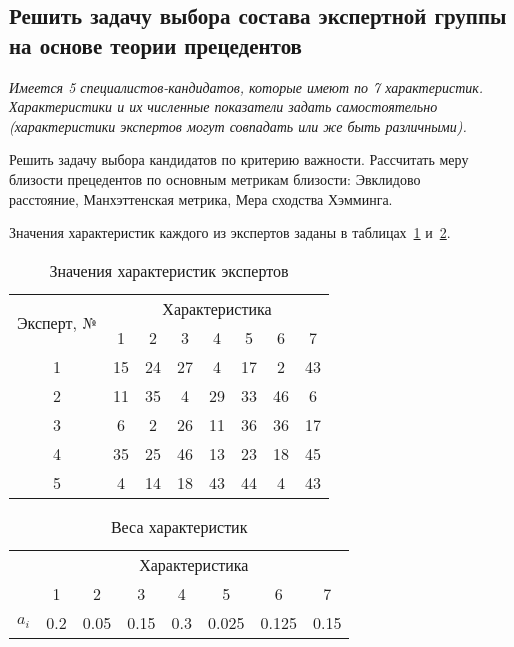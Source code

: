 \subsection{Решить задачу выбора состава экспертной группы на основе теории прецедентов}
{
	\itshape
	Имеется 5 специалистов-кандидатов, которые имеют по 7 характеристик.
	Характеристики и их численные показатели задать самостоятельно \\ (характеристики экспертов могут совпадать или же быть различными).

	Решить задачу выбора кандидатов по критерию важности. Рассчитать меру близости прецедентов по основным метрикам близости: Эвклидово \\ расстояние, Манхэттенская метрика, Мера сходства Хэмминга.
}

Значения характеристик каждого из экспертов заданы в таблицах~\ref{tab:expert_char} и~\ref{tab:expert_char_w}.

\begin{table}[H]
	\caption{Значения характеристик экспертов}
	\label{tab:expert_char}
	\begin{tabular}{|c|c|c|c|c|c|c|c|}
		\hline
		\multirow{2}{*}{Эксперт, № } & \multicolumn{7}{c|}{Характеристика}                               \\ \cline{2-8}
		                             & 1                                   & 2  & 3  & 4  & 5  & 6  & 7  \\ \hline
		1                            & 15                                  & 24 & 27 & 4  & 17 & 2  & 43 \\ \hline
		2                            & 11                                  & 35 & 4  & 29 & 33 & 46 & 6  \\ \hline
		3                            & 6                                   & 2  & 26 & 11 & 36 & 36 & 17 \\ \hline
		4                            & 35                                  & 25 & 46 & 13 & 23 & 18 & 45 \\ \hline
		5                            & 4                                   & 14 & 18 & 43 & 44 & 4  & 43 \\ \hline
	\end{tabular}
\end{table}

\begin{table}[H]
	\caption{Веса характеристик}
	\label{tab:expert_char_w}
	\begin{tabular}{|c|c|c|c|c|c|c|c|}
		\hline
		\multirow{2}{*}{} & \multicolumn{7}{c|}{Характеристика}                                            \\ \cline{2-8}
		                  & 1                                   & 2    & 3    & 4   & 5     & 6     & 7    \\ \hline
		$a_i$             & 0.2                                 & 0.05 & 0.15 & 0.3 & 0.025 & 0.125 & 0.15 \\ \hline
	\end{tabular}
\end{table}

